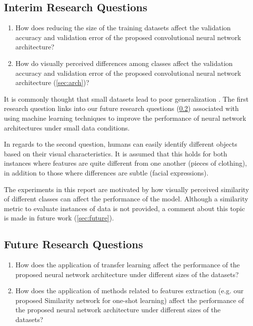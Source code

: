 \documentclass{article}
\begin{document}
\subsection{Interim Research Questions}
\label{sec:irquestions}

\begin{enumerate}
  \item How does reducing the size of the training datasets affect the validation accuracy and validation error of the proposed convolutional neural network architecture?
    \item How do visually perceived differences among classes affect the validation accuracy and validation error of the proposed convolutional neural network architecture (\ref{sec:arch})?
\end{enumerate}

It is commonly thought that small datasets lead to poor generalization \cite{lotsDataAndrew}. The first research question links into our future research questions (\ref{sec:frquestions}) associated with using machine learning techniques to improve the performance of neural network architectures under small data conditions.

In regards to the second question, humans can easily identify different objects based on their visual characteristics. It is assumed that this holds for both instances where features are quite different from one another (pieces of clothing), in addition to those where differences are subtle (facial expressions). 

The experiments in this report are motivated by how visually perceived similarity of different classes can affect the performance of the model. Although a similarity metric to evaluate instances of data is not provided, a comment about this topic is made in future work (\ref{sec:future}).

\subsection{Future Research Questions}
\label{sec:frquestions}

\begin{enumerate}
  \item How does the application of transfer learning affect the performance of the proposed neural network architecture under different sizes of the datasets?
  \item How does the application of methods related to features extraction (e.g. our proposed Similarity network for one-shot learning) affect the performance of the proposed neural network architecture under different sizes of the datasets?
\end{enumerate}
\end{document}
